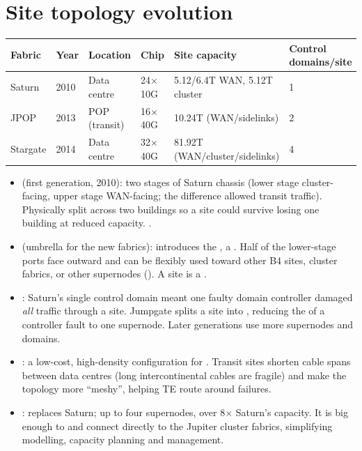 \section{Site topology evolution}
\begin{center}
\small
\begin{tabular}{@{}llllll@{}}
\toprule
\textbf{Fabric} & \textbf{Year} & \textbf{Location} & \textbf{Chip} & \textbf{Site capacity} & \textbf{Control domains/site} \\
\midrule
Saturn & 2010 & Data centre & 24$\times$10G & 5.12/6.4T WAN, 5.12T cluster & 1 \\
JPOP & 2013 & POP (transit) & 16$\times$40G & 10.24T (WAN/sidelinks) & 2 \\
Stargate & 2014 & Data centre & 32$\times$40G & 81.92T (WAN/cluster/sidelinks) & 4 \\
\bottomrule
\end{tabular}
\end{center}
\begin{itemize}
\item {} (first generation, 2010): two stages of Saturn chassis (lower stage cluster-facing, upper stage WAN-facing; the difference allowed transit traffic). Physically split across two buildings so a site could survive losing one building at reduced capacity. .
\item {} (umbrella for the new fabrics): introduces the , a . Half of the lower-stage ports face outward and can be flexibly used toward other B4 sites, cluster fabrics, or other supernodes (). A site is a .
\item {}: Saturn's single control domain meant one faulty domain controller damaged \emph{all} traffic through a site. Jumpgate splits a site into , reducing the  of a controller fault to one supernode. Later generations use more supernodes and domains.
\item {}: a low-cost, high-density configuration for . Transit sites shorten cable spans between data centres (long intercontinental cables are fragile) and make the topology more ``meshy'', helping TE route around failures.
\item {}: replaces Saturn; up to four supernodes, over 8$\times$ Saturn's capacity. It is big enough to  and connect directly to the Jupiter cluster fabrics, simplifying modelling, capacity planning and management.
\end{itemize}

